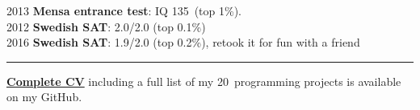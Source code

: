 \documentclass[10pt,letterpaper]{article}
\newcommand{\PLUS}
{\nolinebreak[4]\hspace{-.05em}\raisebox{.22ex}{\footnotesize\bf +}}
\begin{document}
2013 \textbf{Mensa entrance test}: IQ 135\PLUS \ (top 1\%). \\
2012 \textbf{Swedish SAT}: 2.0/2.0 (top 0.1\%) \\
2016 \textbf{Swedish SAT}: 1.9/2.0 (top 0.2\%), retook it for fun with a friend

\vspace{1em}
\hrule
\vspace{1em}

\large{{\href{https://github.com/jakkdl/resume}{\textbf{Complete CV}}}} \normalsize{including a full list of my 20\PLUS \ programming projects is available on my GitHub.}
\end{document}
